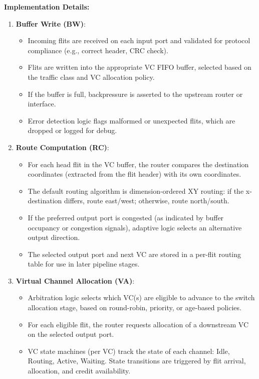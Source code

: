 \documentclass[11pt,a4paper]{article}
\begin{document}
\textbf{Implementation Details:}
\begin{enumerate}
    \item \textbf{Buffer Write (BW)}:
    \begin{itemize}
        \item Incoming flits are received on each input port and validated for protocol compliance (e.g., correct header, CRC check).
        \item Flits are written into the appropriate VC FIFO buffer, selected based on the traffic class and VC allocation policy.
        \item If the buffer is full, backpressure is asserted to the upstream router or interface.
        \item Error detection logic flags malformed or unexpected flits, which are dropped or logged for debug.
    \end{itemize}
    \item \textbf{Route Computation (RC)}:
    \begin{itemize}
        \item For each head flit in the VC buffer, the router compares the destination coordinates (extracted from the flit header) with its own coordinates.
        \item The default routing algorithm is dimension-ordered XY routing: if the x-destination differs, route east/west; otherwise, route north/south.
        \item If the preferred output port is congested (as indicated by buffer occupancy or congestion signals), adaptive logic selects an alternative output direction.
        \item The selected output port and next VC are stored in a per-flit routing table for use in later pipeline stages.
    \end{itemize}
    \item \textbf{Virtual Channel Allocation (VA)}:
    \begin{itemize}
        \item Arbitration logic selects which VC(s) are eligible to advance to the switch allocation stage, based on round-robin, priority, or age-based policies.
        \item For each eligible flit, the router requests allocation of a downstream VC on the selected output port.
        \item VC state machines (per VC) track the state of each channel: Idle, Routing, Active, Waiting. State transitions are triggered by flit arrival, allocation, and credit availability.

\end{itemize}
\end{enumerate}
\end{document}

